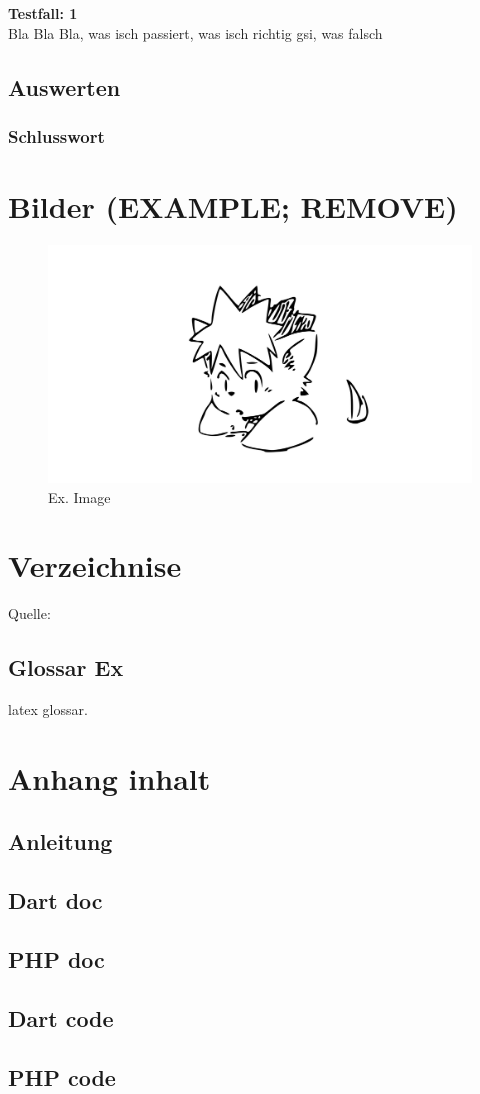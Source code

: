 \documentclass{report}
\begin{document}
\textbf{Testfall: 1} \\
Bla Bla Bla, was isch passiert, was isch richtig gsi, was falsch

\section{Auswerten}
\subsection{Schlusswort}


\chapter{Bilder (EXAMPLE; REMOVE)}

\begin{figure}[htb]
    \centering
    \includegraphics{swim_hires.png}
    \caption{Ex. Image}
    \label{fig:DM}
\end{figure}

\chapter{Verzeichnise}

Quelle: \cite{gugus}

\section{Glossar Ex}
\gls{latex} glossar.

\listoffigures
\printbibliography
\printglossary

\chapter{Anhang inhalt}
\section{Anleitung} %
\section{Dart doc}
\section{PHP doc}
\section{Dart code}
\section{PHP code}
\end{document}
